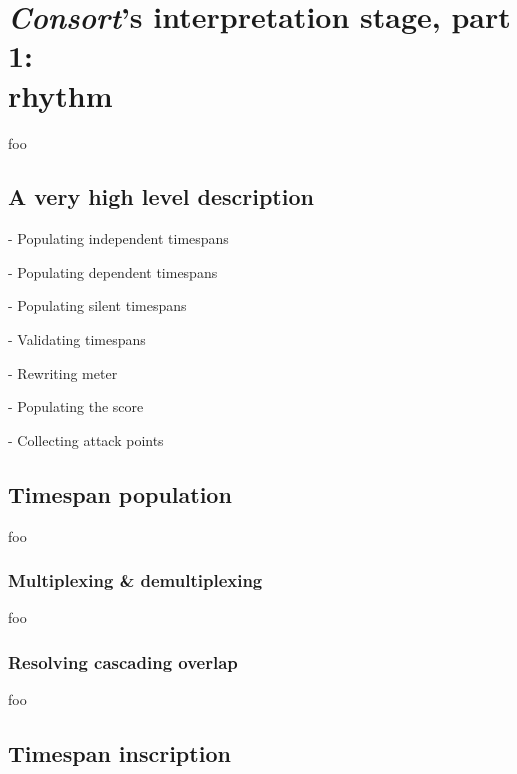 \chapter[\emph{Consort}'s interpretation stage, part 1: rhythm]{
    \emph{Consort}'s interpretation stage, part 1:\\ rhythm}

foo

\section{A very high level description}

- Populating independent timespans

- Populating dependent timespans

- Populating silent timespans

- Validating timespans

- Rewriting meter

- Populating the score

- Collecting attack points

\section{Timespan population}

foo

\subsection{Multiplexing \& demultiplexing}

foo

\subsection{Resolving cascading overlap}

foo

\section{Timespan inscription}

